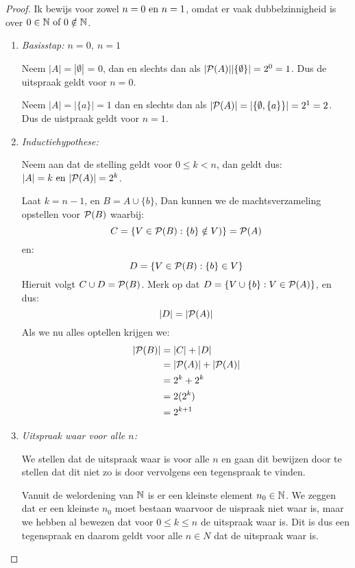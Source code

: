 \documentclass{article}
\begin{document}
\begin{proof}
	Ik bewijs voor zowel $n = 0 \text{ en } n = 1$,
	omdat er vaak dubbelzinnigheid is over
	$0 \in \mathbb{N} \text{ of } 0 \notin \mathbb{N}$.
	\begin{enumerate}
		\item \emph{Basisstap: $n = 0, \ n = 1$}

		      Neem $|A| = |\emptyset|$ = 0,
		      dan en slechts dan als
		      $|\mathcal{P}(A)| |\{\emptyset\}| = 2^0 = 1$.
		      Dus de uitspraak geldt voor $n = 0$.


		      Neem $|A| = |\{a\}| = 1$
		      dan en slechts dan als
		      $|\mathcal{P}(A)| = |\{\emptyset, \{a\}\}| = 2^1 = 2$.
		      Dus de uistpraak geldt voor $n = 1$.
		\item \emph{Inductiehypothese:}

		      Neem aan dat de stelling geldt voor
		      $0 \leq k < n$, dan geldt dus:
		      $|A| = k \text{ en } |\mathcal{P}(A)| = 2^k$.

		      Laat $k = n-1$, en $B = A \cup \{b\}$,
		      Dan kunnen we de machtsverzameling opstellen
		      voor $\mathcal{P}(B)$ waarbij:
		      \[C = \{V \in \mathcal{P}(B): \{b\} \notin V)\} = \mathcal{P}(A) \]
		      en:
		      \[ D = \{V \in \mathcal{P}(B): \{b\} \in V \} \]
		      Hieruit volgt $C \cup D = \mathcal{P}(B)$. Merk op
		      dat $D = \{V \cup \{b\} : V \in \mathcal{P}(A)\}$, en dus:
		      \[|D| = |\mathcal{P}(A)|\]
		      Als we nu alles optellen krijgen we:
		      \begin{align*}
			      |\mathcal{P}(B)| & = |C| + |D|             \\
			                & = |\mathcal{P}(A)| + |\mathcal{P}(A)| \\
			                & = 2^k + 2^k             \\
			                & = 2(2^k)                \\
			                & = 2^{k+1}               \\
		      \end{align*}
		\item \emph{Uitspraak waar voor alle $n$:}

		      We stellen dat de uitspraak waar is voor alle
		      $n$ en gaan dit bewijzen door te stellen dat
		      dit niet zo is door vervolgens een tegenspraak
		      te vinden.

		      Vanuit de welordening van $\mathbb{N}$ is er een kleinste
		      element $n_0 \in \mathbb{N}$.
		      We zeggen dat er een kleinste $n_0$ moet bestaan
		      waarvoor de uispraak niet waar is, maar
		      we hebben al bewezen dat voor $0 \leq k \leq n$
		      de uitspraak waar is. Dit is dus een tegenspraak
		      en daarom geldt voor alle $n \in N$ dat de uitspraak waar is.
	\end{enumerate}
\end{proof}
\end{document}
